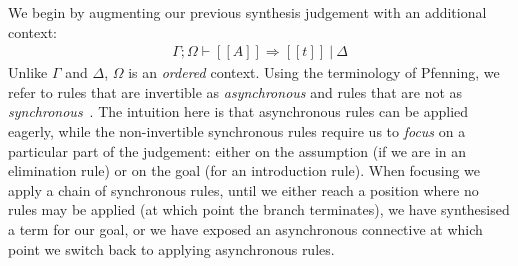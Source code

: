 We begin by augmenting our previous synthesis judgement with an additional
context:
\begin{align*}
\Gamma ; \Omega \vdash [[ A ]] \Rightarrow [[t ]]\ |\ \Delta
\end{align*}
Unlike $\Gamma$ and $\Delta$, $\Omega$ is an \textit{ordered} context. Using the terminology of Pfenning, we refer to rules that are
invertible as \textit{asynchronous} and rules that are not as
\textit{synchronous}~\cite{pfenninglecture}. The intuition here is that asynchronous rules can
be applied eagerly, while the non-invertible synchronous rules require us to \textit{focus} on
a particular part of the judgement: either on the assumption (if we are in an
elimination rule) or on the goal (for an introduction rule). When
focusing we apply a chain of synchronous rules, until we either reach a position where
no rules may be applied (at which point the branch terminates), we have
synthesised a term for our goal, or we have exposed an asynchronous connective
at which point we switch back to applying asynchronous rules.

